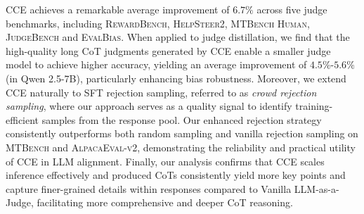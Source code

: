 CCE achieves a remarkable average improvement of $6.7\%$ across five judge benchmarks, including \textsc{RewardBench}, \textsc{HelpSteer2}, \textsc{MTBench Human}, \textsc{JudgeBench} and \textsc{EvalBias}. When applied to judge distillation, we find that the high-quality long CoT judgments generated by CCE enable a smaller judge model to achieve higher accuracy, yielding an average improvement of $4.5\%$-$5.6\%$ (in Qwen 2.5-7B), particularly enhancing bias robustness. Moreover, we extend \textsc{CCE} naturally to SFT rejection sampling, referred to as \textit{crowd rejection sampling}, where our approach serves as a quality signal to identify training-efficient samples from the response pool. Our enhanced rejection strategy consistently outperforms both random sampling and vanilla rejection sampling on \textsc{MTBench} and \textsc{AlpacaEval-v2}, demonstrating the reliability and practical utility of \textsc{CCE} in LLM alignment. Finally, our analysis confirms that \textsc{CCE} scales inference effectively and produced CoTs consistently yield more key points and capture finer-grained details within responses compared to Vanilla LLM-as-a-Judge, facilitating more comprehensive and deeper CoT reasoning. 